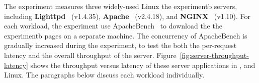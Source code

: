 The experiment measures three widely-used Linux the experimentb servers, including {\bf Lighttpd}~\cite{lighttpd} (v1.4.35), {\bf Apache}~\cite{apache} (v2.4.18), and {\bf NGINX}~\cite{nginx} (v1.10).
For each workload, the experiment use ApacheBench~\cite{apachebench} to download the the experimentb pages on a separate machine.
The concurrency of ApacheBench is gradually increased during the experiment, to test the both the per-request latency and the overall throughput of the server.
Figure~\ref{fig:server-throughput-latency} shows the throughput versus latency of these server applications
in \graphenesgx{}, \graphene{} and Linux. 
The paragraphs below discuss each workload individually.





